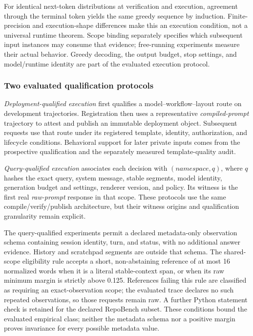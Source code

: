 For identical next-token distributions at verification and execution, agreement through the terminal token yields the same greedy sequence by induction. Finite-precision and execution-shape differences make this an execution condition, not a universal runtime theorem. Scope binding separately specifies which subsequent input instances may consume that evidence; free-running experiments measure their actual behavior. Greedy decoding, the output budget, stop settings, and model/runtime identity are part of the evaluated execution protocol.

\subsubsection{Two evaluated qualification protocols}
\emph{Deployment-qualified execution} first qualifies a model--workflow--layout route on development trajectories. Registration then uses a representative \emph{compiled-prompt} trajectory to attest and publish an immutable deployment object. Subsequent requests use that route under its registered template, identity, authorization, and lifecycle conditions. Behavioral support for later private inputs comes from the prospective qualification and the separately measured template-quality audit.

\emph{Query-qualified execution} associates each decision with $(\textit{namespace},q)$, where $q$ hashes the exact query, system message, stable segments, model identity, generation budget and settings, renderer version, and policy. Its witness is the first real \emph{raw-prompt} response in that scope. These protocols use the same compile/verify/publish architecture, but their witness origins and qualification granularity remain explicit.

The query-qualified experiments permit a declared metadata-only observation schema containing session identity, turn, and status, with no additional answer evidence. History and scratchpad segments are outside that schema. The shared-scope eligibility rule accepts a short, non-abstaining reference of at most 16 normalized words when it is a literal stable-context span, or when its raw minimum margin is strictly above 0.125. References failing this rule are classified as requiring an exact-observation scope; the evaluated trace declares no such repeated observations, so those requests remain raw. A further Python statement check is retained for the declared RepoBench subset. These conditions bound the evaluated empirical class; neither the metadata schema nor a positive margin proves invariance for every possible metadata value.

